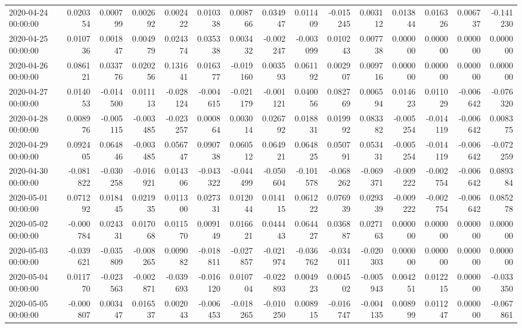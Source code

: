 \begin{tabular}{lrrrrrrrrrrrrrr}
2020-04-24 00:00:00 & 0.020354 & 0.000799 & 0.002692 & 0.002422 & 0.010338 & 0.008766 & 0.034947 & 0.011409 & -0.015245 & 0.003112 & 0.013844 & 0.016326 & 0.006737 & -0.141230 \\
2020-04-25 00:00:00 & 0.010736 & 0.001847 & 0.004979 & 0.024374 & 0.035338 & 0.003432 & -0.002247 & -0.003099 & 0.010243 & 0.007738 & 0.000000 & 0.000000 & 0.000000 & 0.000000 \\
2020-04-26 00:00:00 & 0.086121 & 0.033776 & 0.020256 & 0.131641 & 0.016377 & -0.019160 & 0.003593 & 0.061192 & 0.002907 & 0.009716 & 0.000000 & 0.000000 & 0.000000 & 0.000000 \\
2020-04-27 00:00:00 & 0.014053 & -0.014500 & 0.011113 & -0.028124 & -0.004615 & -0.021179 & -0.001121 & 0.040056 & 0.082769 & 0.006594 & 0.014623 & 0.011029 & -0.006642 & -0.076320 \\
2020-04-28 00:00:00 & 0.008976 & -0.005115 & -0.003485 & -0.023257 & 0.000864 & 0.003014 & 0.026792 & 0.018831 & 0.019992 & 0.083382 & -0.005254 & -0.014119 & -0.006642 & 0.008375 \\
2020-04-29 00:00:00 & 0.092405 & 0.064846 & -0.003485 & 0.056747 & 0.090738 & 0.060512 & 0.064921 & 0.064825 & 0.050791 & 0.053431 & -0.005254 & -0.014119 & -0.006642 & -0.072259 \\
2020-04-30 00:00:00 & -0.081822 & -0.030258 & -0.016921 & 0.014306 & -0.043322 & -0.044499 & -0.050604 & -0.101578 & -0.068262 & -0.069371 & -0.009222 & -0.002754 & -0.006642 & 0.089384 \\
2020-05-01 00:00:00 & 0.071292 & 0.018445 & 0.021935 & 0.011300 & 0.027331 & 0.012044 & 0.014115 & 0.061222 & 0.076939 & 0.029339 & -0.009222 & -0.002754 & -0.006642 & 0.085278 \\
2020-05-02 00:00:00 & -0.000784 & 0.024331 & 0.017068 & 0.011570 & 0.009149 & 0.016621 & 0.044443 & 0.064427 & 0.036887 & 0.027163 & 0.000000 & 0.000000 & 0.000000 & 0.000000 \\
2020-05-03 00:00:00 & -0.039621 & -0.035809 & -0.008265 & 0.009082 & -0.018811 & -0.027857 & -0.021974 & -0.036762 & -0.034011 & -0.020303 & 0.000000 & 0.000000 & 0.000000 & 0.000000 \\
2020-05-04 00:00:00 & 0.011770 & -0.023563 & -0.002871 & -0.039693 & -0.016120 & 0.010704 & -0.022893 & 0.004923 & 0.004502 & -0.005943 & 0.004251 & 0.012215 & 0.000000 & -0.033350 \\
2020-05-05 00:00:00 & -0.000807 & 0.003447 & 0.016537 & 0.002043 & -0.006453 & -0.018265 & -0.010250 & 0.008915 & -0.016747 & -0.004135 & 0.008999 & 0.011247 & 0.000000 & -0.067861 \\

\end{tabular}
